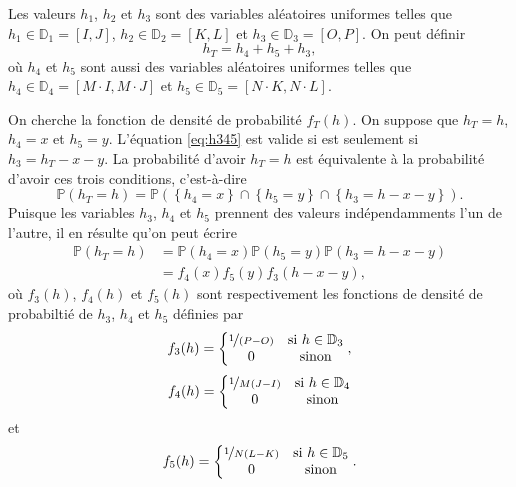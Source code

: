 \documentclass[11pt]{article}
\begin{document}
Les valeurs $h_1$, $h_2$ et $h_3$ sont des variables aléatoires uniformes
telles que $h_1\in\mathbb{D}_1=[I,J]$, $h_2\in\mathbb{D}_2=[K,L]$ et
$h_3\in\mathbb{D}_3=[O,P]$. On peut définir
\begin{equation*}\label{eq:h345}
    h_T=h_4+h_5+h_3,
\end{equation*}
où $h_4$ et $h_5$ sont aussi des variables aléatoires uniformes telles que
$h_4\in\mathbb{D}_4=[M\cdot I,M\cdot J]$ et $h_5\in\mathbb{D}_5=
[N\cdot K,N\cdot L]$.

On cherche la fonction de densité de probabilité $f_T(h)$. On suppose que
$h_T=h$, $h_4=x$ et $h_5=y$. L'équation \eqref{eq:h345} est valide si est
seulement si $h_3=h_T-x-y$. La probabilité d'avoir $h_T=h$ est équivalente
à la probabilité d'avoir ces trois conditions, c'est-à-dire
\begin{equation*}
    \mathbb{P}(h_T=h)=
    \mathbb{P}(
        \left\{h_4=x\right\}\cap
        \left\{h_5=y\right\}\cap
        \left\{h_3=h-x-y\right\}).
\end{equation*}
Puisque les variables $h_3$, $h_4$ et $h_5$ prennent des valeurs 
indépendamments l'un de l'autre, il en résulte qu'on peut écrire
\begin{equation}\label{eq:hth}
    \begin{split}
        \mathbb{P}(h_T=h)&=
        \mathbb{P}(h_4=x)
        \mathbb{P}(h_5=y)
        \mathbb{P}(h_3=h-x-y)\\&=
        f_4(x)f_5(y)f_3(h-x-y),
    \end{split}
\end{equation}
où $f_3(h)$, $f_4(h)$ et $f_5(h)$ sont respectivement les fonctions de
densité de probabiltié de $h_3$, $h_4$ et $h_5$ définies par
\begin{equation*}
    f_3(h)=\left\{
        \begin{matrix}
            \nicefrac{1}{(P-O)}&\text{si } h\in\mathbb{D}_3\\
            0                  &\text{sinon}\\
        \end{matrix}
    \right.,
\end{equation*}
\begin{equation*}
    f_4(h)=\left\{
        \begin{matrix}
            \nicefrac{1}{M(J-I)}&\text{si } h\in\mathbb{D}_4\\
            0                   &\text{sinon}\\
        \end{matrix}
    \right.
\end{equation*}
et
\begin{equation*}
    f_5(h)=\left\{
        \begin{matrix}
            \nicefrac{1}{N(L-K)}&\text{si } h\in\mathbb{D}_5\\
            0                   &\text{sinon}\\
        \end{matrix}
    \right..
\end{equation*}
\end{document}
